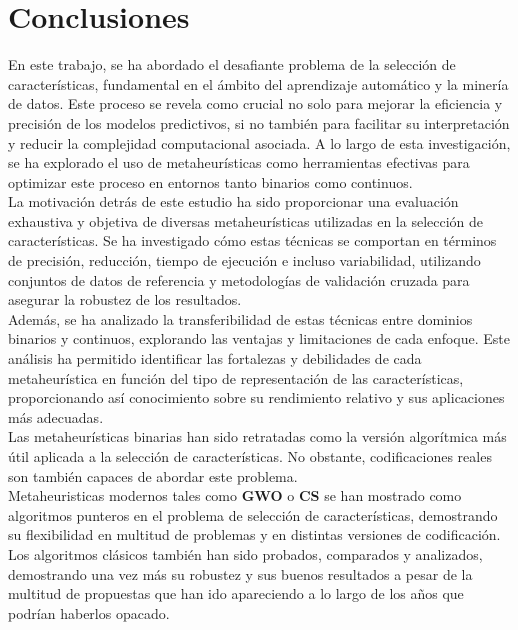\chapter{Conclusiones}
En este trabajo, se ha abordado el desafiante problema de la selección de características, fundamental en el ámbito del aprendizaje automático y la minería de datos. Este proceso se revela como crucial no solo para mejorar la eficiencia y precisión de los modelos predictivos, si no también para facilitar su interpretación y reducir la complejidad computacional asociada. A lo largo de esta investigación, se ha explorado el uso de metaheurísticas como herramientas efectivas para optimizar este proceso en entornos tanto binarios como continuos.\\[6pt]
La motivación detrás de este estudio ha sido proporcionar una evaluación exhaustiva y objetiva de diversas metaheurísticas utilizadas en la selección de características. Se ha investigado cómo estas técnicas se comportan en términos de precisión, reducción, tiempo de ejecución e incluso variabilidad, utilizando conjuntos de datos de referencia y metodologías de validación cruzada para asegurar la robustez de los resultados.\\[6pt]
Además, se ha analizado la transferibilidad de estas técnicas entre dominios binarios y continuos, explorando las ventajas y limitaciones de cada enfoque. Este análisis ha permitido identificar las fortalezas y debilidades de cada metaheurística en función del tipo de representación de las características, proporcionando así conocimiento sobre su rendimiento relativo y sus aplicaciones más adecuadas.\\[6pt]
Las metaheurísticas binarias han sido retratadas como la versión algorítmica más útil aplicada a la selección de características. No obstante, codificaciones reales son también capaces de abordar este problema.\\[6pt]
Metaheuristicas modernos tales como \textbf{GWO} o \textbf{CS} se han mostrado como algoritmos punteros en el problema de selección de características, demostrando su flexibilidad en multitud de problemas y en distintas versiones de codificación. Los algoritmos clásicos también han sido probados, comparados y analizados, demostrando una vez más su robustez y sus buenos resultados a pesar de la multitud de propuestas que han ido apareciendo a lo largo de los años que podrían haberlos opacado.\\[6pt]
